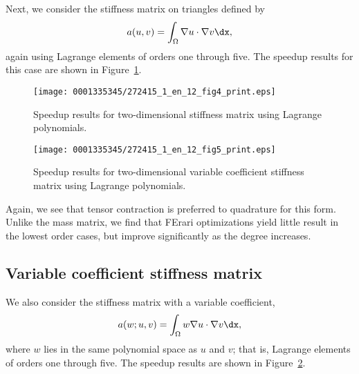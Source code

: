 Next, we consider the stiffness matrix on triangles defined by\vspace*{1.5pt}
\begin{equation}
  a(u, v) = \int_{\Omega} \nabla u \cdot \nabla v \dx,\vspace*{1.5pt}
\end{equation}
again using Lagrange elements of orders one through five. The speedup
results for this case are shown in Figure~\ref{fig:Poisson}.

\begin{figure}[!p]
\vspace*{-4pt}
\bwfig
  \centering
  \texttt{[image: 0001335345/272415\_1\_en\_12\_fig4\_print.eps]}
  \caption{Speedup results for two-dimensional stiffness matrix using Lagrange polynomials.}
  \label{fig:Poisson}\vspace*{16pt}
\end{figure}

\begin{figure}[!p]
\bwfig
  \centering
  \texttt{[image: 0001335345/272415\_1\_en\_12\_fig5\_print.eps]}
  \caption{Speedup results for two-dimensional variable coefficient
    stiffness matrix using Lagrange polynomials.}
  \label{fig:WeightedPoisson}
\end{figure}

Again, we see that tensor contraction is preferred to quadrature for
this form. Unlike the mass matrix, we find that FErari optimizations
yield little result in the lowest order cases, but improve
significantly as the degree increases.

\vspace*{2pt}
\subsection{Variable coefficient stiffness matrix}

We also consider the stiffness matrix with a variable coefficient,\vspace*{1.5pt}
\begin{equation}
a(w; u, v) = \int_{\Omega} w \nabla u \cdot \nabla v \dx,\vspace*{1.5pt}
\end{equation}
where $ w $ lies in the same polynomial space as $ u $ and $ v$; that
is, Lagrange elements of orders one through five. The speedup results
are shown in Figure~\ref{fig:WeightedPoisson}.


